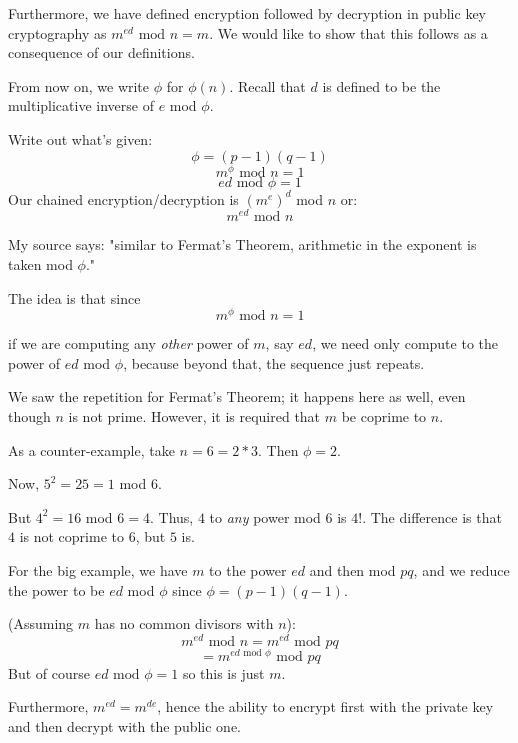 \documentclass[11pt, oneside]{article}
\begin{document}
Furthermore, we have defined encryption followed by decryption in public key cryptography as $m^{ed} \text{ mod } n = m$.  We would like to show that this follows as a consequence of our definitions.  

From now on, we write $\phi$ for $\phi(n)$.  Recall that $d$ is defined to be the multiplicative inverse of $e$ mod $\phi$. 

Write out what's given:
\[ \phi = (p - 1)(q - 1) \]
\[ m^{\phi} \text{ mod } n = 1 \]
\[ ed  \text{ mod } \phi = 1 \]
Our chained encryption/decryption is $(m^{e})^{d}$ mod $n$  or:
\[ m^{ed} \text{ mod } n \]

My source says:  "similar to Fermat's Theorem, arithmetic in the exponent is taken mod $\phi$."  

The idea is that since  
\[ m^{\phi} \text{ mod } n = 1 \]

if we are computing any \emph{other} power of $m$, say $ed$, we need only compute to the power of $ed$ mod $\phi$, because beyond that, the sequence just repeats.

We saw the repetition for Fermat's Theorem;  it happens here as well, even though $n$ is not prime.  However, it is required that $m$ be coprime to $n$.  

As a counter-example, take $n = 6 = 2*3$.  Then $\phi = 2$.  

Now, $5^2 = 25 = 1$ mod $6$. 

 But $4^2 = 16$ mod $6 = 4$.  Thus, $4$ to \emph{any} power mod $6$ is $4$!.  The difference is that $4$ is not coprime to $6$, but $5$ is.

For the big example, we have $m$  to the power $ed$ and then mod $pq$, and we reduce the power to be $ed$ mod $\phi$ since $\phi = (p-1)(q-1)$.

(Assuming $m$ has no common divisors with $n$):
\[ m^{ed} \text{ mod } n = m^{ed} \text{ mod } pq \]
\[ = m^{ed \text{ mod } \phi} \text{ mod } pq \]
But of course $ed \text{ mod } \phi = 1$ so this is just $m$.

Furthermore, $m^{ed} = m^{de}$, hence the ability to encrypt first with the private key and then decrypt with the public one.
\end{document}
